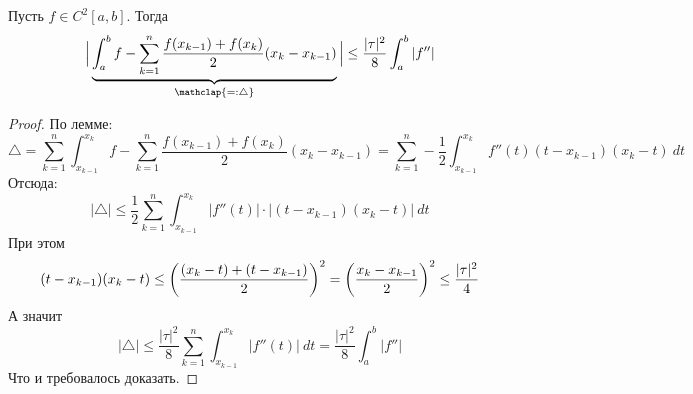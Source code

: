 \begin{theorem}
    Пусть $f \in C^2[a, b]$. Тогда
    \begin{equation*}
        \Big| \underbrace{\int_{a}^{b} f - \sum_{k = 1}^{n}
        \frac{f(x_{k - 1}) + f(x_k)}{2}(x_k - x_{k - 1})}_{\mathclap{=: \triangle}} \Big| \leq
        \frac{|\tau|^2}{8}\int_{a}^{b} |f''|
    \end{equation*}
\end{theorem}
\begin{proof}
  По лемме:
    \begin{equation*}
            \triangle = \sum_{k = 1}^{n} \int_{{x_{k - 1}}}^{{x_k}} {f} -
            \sum_{k = 1}^{n} \frac{f(x_{k - 1}) + f(x_k)}{2}(x_k - x_{k - 1}) =
            \sum_{k = 1}^{n} - \frac{1}{2} \int_{{x_{k - 1}}}^{{x_k}} {f''(t)
            (t - x_{k - 1})(x_k - t)} \: d{t}
    \end{equation*}
    Отсюда:
    \begin{equation*}
            |\triangle| \leq \frac{1}{2} \sum_{k = 1}^{n}
            \int_{{x_{k - 1}}}^{{x_k}} {|f''(t)| \cdot |(t - x_{k - 1})(x_k - t)|} \: d{t}
    \end{equation*}
    При этом
    \begin{equation*}
            (t - x_{k - 1})(x_k - t) \leq \left(\frac{(x_k - t) + (t - x_{k - 1})}{2}\right)^2 =
            \left(\frac{x_k - x_{k - 1}}{2}\right)^2 \leq \frac{|\tau|^2}{4} \\
    \end{equation*}
    А значит
    \begin{equation*}
            |\triangle| \leq
            \frac{|\tau|^2}{8} \sum_{k = 1}^{n} \int_{x_{k - 1}}^{x_k}|f''(t)| \: dt =
            \frac{|\tau|^2}{8} \int_{a}^{b} |f''|
    \end{equation*}
    Что и требовалось доказать.
\end{proof}


